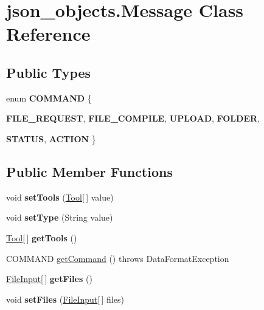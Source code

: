 \hypertarget{classjson__objects_1_1_message}{
\section{json\_\-objects.Message Class Reference}
\label{classjson__objects_1_1_message}
}
\subsection*{Public Types}
\begin{DoxyCompactItemize}
\item 
enum {\bfseries COMMAND} \{ \par
{\bfseries FILE\_\-REQUEST}, 
{\bfseries FILE\_\-COMPILE}, 
{\bfseries UPLOAD}, 
{\bfseries FOLDER}, 
\par
{\bfseries STATUS}, 
{\bfseries ACTION}
 \}
\end{DoxyCompactItemize}
\subsection*{Public Member Functions}
\begin{DoxyCompactItemize}
\item 
\hypertarget{classjson__objects_1_1_message_a29fb021e5a976ae63985307843c366e8}{
void {\bfseries setTools} (\hyperlink{classjson__objects_1_1tools_1_1_tool}{Tool}\mbox{[}$\,$\mbox{]} value)}
\label{classjson__objects_1_1_message_a29fb021e5a976ae63985307843c366e8}

\item 
\hypertarget{classjson__objects_1_1_message_af9771591a69bc19ef57389344cae5f05}{
void {\bfseries setType} (String value)}
\label{classjson__objects_1_1_message_af9771591a69bc19ef57389344cae5f05}

\item 
\hypertarget{classjson__objects_1_1_message_afd094ea047ada13ed88b72c56f5b6d61}{
\hyperlink{classjson__objects_1_1tools_1_1_tool}{Tool}\mbox{[}$\,$\mbox{]} {\bfseries getTools} ()}
\label{classjson__objects_1_1_message_afd094ea047ada13ed88b72c56f5b6d61}

\item 
COMMAND \hyperlink{classjson__objects_1_1_message_acfbbee072c300f623da11056bec3c153}{getCommand} ()  throws DataFormatException 	
\item 
\hypertarget{classjson__objects_1_1_message_a28b2901624b030c1c3f7216227fbe3ea}{
\hyperlink{classjson__objects_1_1_file_input}{FileInput}\mbox{[}$\,$\mbox{]} {\bfseries getFiles} ()}
\label{classjson__objects_1_1_message_a28b2901624b030c1c3f7216227fbe3ea}

\item 
\hypertarget{classjson__objects_1_1_message_ac4e44dc329815534aa6a730c6fd3caf1}{
void {\bfseries setFiles} (\hyperlink{classjson__objects_1_1_file_input}{FileInput}\mbox{[}$\,$\mbox{]} files)}
\label{classjson__objects_1_1_message_ac4e44dc329815534aa6a730c6fd3caf1}

\end{DoxyCompactItemize}


